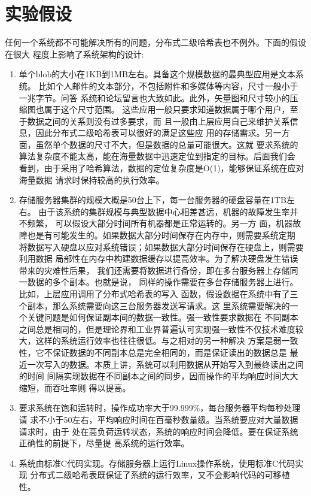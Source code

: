 \section{实验假设}\label{section:assumption}
任何一个系统都不可能解决所有的问题，分布式二级哈希表也不例外。下面的假设在很大
程度上影响了系统架构的设计:
\begin{enumerate}
  \item 单个blob的大小在1KB到1MB左右。具备这个规模数据的最典型应用是文本系统。
  比如个人邮件的文本部分，不包括附件和多媒体等内容，尺寸一般小于一兆字节。问答
  系统和论坛留言也大致如此。此外，矢量图和尺寸较小的压缩图也属于这个尺寸范围。
  这些应用一般只要求知道数据属于哪个用户，至于数据之间的关系则没有过多要求，而
  且一般由上层应用自己来维护关系信息，因此分布式二级哈希表可以很好的满足这些应
  用的存储需求。另一方面，虽然单个数据的尺寸不大，但是数据的总量可能很大。这就
  要求系统的算法复杂度不能太高，能在海量数据中迅速定位到指定的目标。后面我们会
  看到，由于采用了哈希算法，数据的定位复杂度是O(1)，能够保证系统在应对海量数据
  请求时保持较高的执行效率。
  \item 存储服务器集群的规模大概是50台上下，每一台服务器的硬盘容量在1TB左右。
  由于该系统的集群规模与典型数据中心相差甚远，机器的故障发生率并不频繁，
  \cite{hastorun2007dynamo}可以假设大部分时间所有机器都是正常运转的。另一方
  面，机器故障也是有可能发生的。如果数据大部分时间保存在内存中，则需要系统定期
  将数据写入硬盘以应对系统错误；如果数据大部分时间保存在硬盘上，则需要利用数据
  局部性在内存中构建数据缓存以提高效率。为了解决硬盘发生错误带来的灾难性后果，
  我们还需要将数据进行备份，即在多台服务器上存储同一数据的多个副本。也就是说，
  同样的操作需要在多台存储服务器上进行。比如，上层应用调用了分布式哈希表的写入
  函数，假设数据在系统中有了三个副本，那么系统需要向这三台服务器发送写请求。这
  里系统需要解决的一个关键问题是如何保证副本间的数据一致性。强一致性要求数据在
  不同副本之间总是相同的，但是理论界和工业界普遍认可实现强一致性不仅技术难度较
  大，这样的系统运行效率也往往很低。\cite{fox1997cluster}与之相对的另一种解决
  方案是弱一致性，它不保证数据的不同副本总是完全相同的，而是保证读出的数据总是
  最近一次写入的数据。本质上讲，系统可以利用数据从开始写入到最终读出之间的时间
  间隔实现数据在不同副本之间的同步，因而操作的平均响应时间大大缩短，而吞吐率则
  得以提高。
  \item 要求系统在饱和运转时，操作成功率大于99.999\%，每台服务器平均每秒处理请
  求不小于50左右，平均响应时间在百毫秒数量级。当系统要应对大量数据请求时，由于
  处在高负荷运转状态，系统的响应时间会降低。要在保证系统正确性的前提下，尽量提
  高系统的运行效率。
  \item 系统由标准C代码实现。存储服务器上运行Linux操作系统，使用标准C代码实现
  分布式二级哈希表既保证了系统的运行效率，又不会影响代码的可移植性。
  
\end{enumerate}
